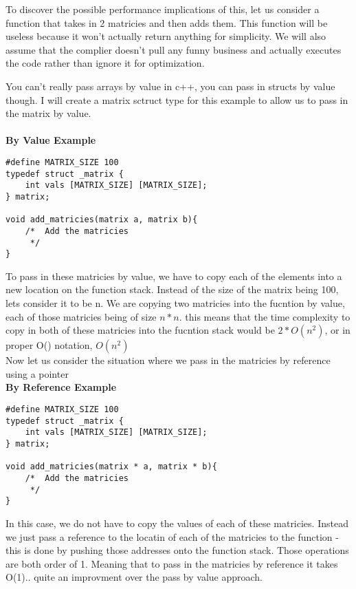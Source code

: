 \documentclass[11pt]{article}
\begin{document}
To discover the possible performance implications of this, let us consider a
function that takes in 2 matricies and then adds them.  This function will be
useless because it won't actually return anything for simplicity.  We will also
assume that the complier doesn't pull any funny business and actually
executes the code rather than ignore it for optimization.

You can't really pass arrays by value in c++, you can pass in structs by value
though.  I will create a matrix sctruct type for this example to allow us to
pass in the matrix by value.\\\\

\textbf{By Value Example}
\begin{lstlisting}[style=MyC++]
#define MATRIX_SIZE 100
typedef struct _matrix {
    int vals [MATRIX_SIZE] [MATRIX_SIZE];
} matrix;

void add_matricies(matrix a, matrix b){
    /*  Add the matricies
     */
}
\end{lstlisting}



To pass in these matricies by value, we have to copy each of the elements
into a new location on the function stack.  Instead of the size of the matrix
being 100, lets consider it to be n.  We are copying two matricies into the
fucntion by value, each of those matricies being of size $n * n$.  this means that
the time complexity to copy in both of these matricies into the fucntion stack
would be $2 * O(n^2)$, or in proper O() notation, $O(n^2)$\\

Now let us consider the situation where we pass in the matricies by reference
using a pointer\\

\textbf{By Reference Example}
\begin{lstlisting}[style=MyC++]
#define MATRIX_SIZE 100
typedef struct _matrix {
    int vals [MATRIX_SIZE] [MATRIX_SIZE];
} matrix;

void add_matricies(matrix * a, matrix * b){
    /*  Add the matricies
     */
}
\end{lstlisting}

In this case, we do not have to copy the values of each of these matricies.
Instead we just pass a reference to the locatin of each of the matricies to the
function - this is done by pushing those addresses onto the function stack.
Those operations are both order of 1.  Meaning that to pass in the matricies by
reference it takes O(1).. quite an improvment over the pass by value approach.
\end{document}
